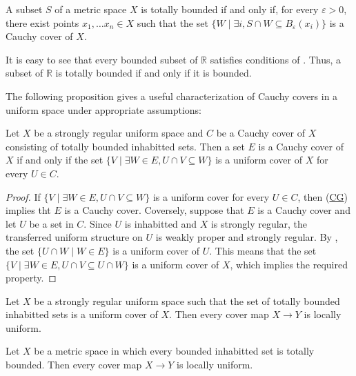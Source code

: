 \documentclass[reqno]{amsart}
\newcommand{\axref}[1]{(\hyperref[ax:#1]{#1})}
\theoremstyle{definition}
\theoremstyle{remark}
\numberwithin{figure}{section}
\begin{document}
\begin{cor}[tb-metric]
A subset $S$ of a metric space $X$ is totally bounded if and only if, for every $\varepsilon > 0$, there exist points $x_1, \ldots x_n \in X$ such that the set $\{ W \mid \exists i, S \cap W \subseteq B_\varepsilon(x_i) \}$ is a Cauchy cover of $X$.
\end{cor}

\begin{example}
It is easy to see that every bounded subset of $\mathbb{R}$ satisfies conditions of .
Thus, a subset of $\mathbb{R}$ is totally bounded if and only if it is bounded.
\end{example}

The following proposition gives a useful characterization of Cauchy covers in a uniform space under appropriate assumptions:

\begin{prop}
Let $X$ be a strongly regular uniform space and $C$ be a Cauchy cover of $X$ consisting of totally bounded inhabitted sets.
Then a set $E$ is a Cauchy cover of $X$ if and only if the set $\{ V \mid \exists W \in E, U \cap V \subseteq W \}$ is a uniform cover of $X$ for every $U \in C$.
\end{prop}
\begin{proof}
If $\{ V \mid \exists W \in E, U \cap V \subseteq W \}$ is a uniform cover for every $U \in C$, then \axref{CG} implies tht $E$ is a Cauchy cover.
Coversely, suppose that $E$ is a Cauchy cover and let $U$ be a set in $C$.
Since $U$ is inhabitted and $X$ is strongly regular, the transferred uniform structure on $U$ is weakly proper and strongly regular.
By , the set $\{ U \cap W \mid W \in E \}$ is a uniform cover of $U$.
This means that the set $\{ V \mid \exists W \in E, U \cap V \subseteq U \cap W \}$ is a uniform cover of $X$, which implies the required property.
\end{proof}

\begin{cor}
Let $X$ be a strongly regular uniform space such that the set of totally bounded inhabitted sets is a uniform cover of $X$.
Then every cover map $X \to Y$ is locally uniform.
\end{cor}

\begin{cor}
Let $X$ be a metric space in which every bounded inhabitted set is totally bounded.
Then every cover map $X \to Y$ is locally uniform.
\end{cor}
\end{document}
